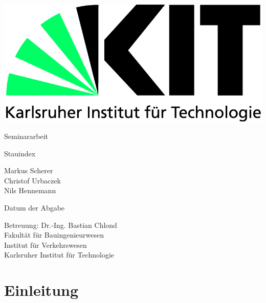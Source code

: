 \documentclass[12pt,a4paper]{scrartcl}
\begin{document}
  \pagestyle{empty}

  \begin{titlepage}

    \includegraphics[scale=0.45]{kit-logo.jpg} 
    \vspace*{2cm} 

 \begin{center} \large 
    
    Seminararbeit
    \vspace*{2cm}

    {\huge Stauindex}
    \vspace*{2.5cm}

    Markus Scherer\\
    Christof Urbaczek\\
    Nils Hennemann
    
    \vspace*{1.5cm}

    Datum der Abgabe
    \vspace*{3.5cm}

    Betreuung: Dr.-Ing. Bastian Chlond \\[1cm]
    Fakultät für Bauingenieurwesen \\[0.5cm]
    Institut für Verkehrswesen \\[1cm]
    
		Karlsruher Institut für Technologie
  \end{center}
\end{titlepage}



  \tableofcontents

\newpage
 


  \pagestyle{headings}
  
\section{Einleitung}
\end{document}
